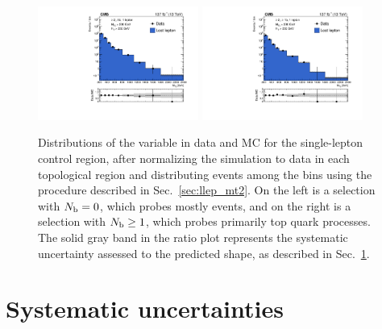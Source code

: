 \begin{figure}[t]
  \begin{center}
    \includegraphics[width=0.47\textwidth]{figs/llep/lostlepHybrid_0b_mt2bins.pdf}
    \includegraphics[width=0.47\textwidth]{figs/llep/lostlepHybrid_ge1b_mt2bins.pdf}
    \caption{Distributions of the \mttwo variable in data and MC for the single-lepton control region,
      after normalizing the simulation to data in each topological region and distributing events
      among the \mttwo bins using the procedure described in Sec.~\ref{sec:llep_mt2}. On the left is a selection
      with $N_{\mathrm{b}}=0$, which probes mostly \wjets events, and on the right is a selection with $N_{\mathrm{b}}\geq1$, which
      probes primarily top quark processes. The solid gray band  in the ratio plot represents the
      systematic uncertainty assessed to the predicted \mttwo shape, as described in Sec.~\ref{sec:llep_syst}.
            }
    \label{fig:llep_mt2dist}
  \end{center}
\end{figure}

\section{Systematic uncertainties}
\label{sec:llep_syst}
